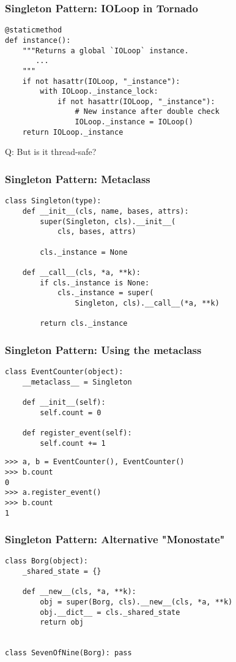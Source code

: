 \documentclass{beamer}
\begin{document}
\begin{frame}[fragile]
\frametitle{Singleton Pattern: IOLoop in Tornado}
\begin{footnotesize}
\begin{verbatim}
@staticmethod
def instance():
    """Returns a global `IOLoop` instance.
       ...
    """
    if not hasattr(IOLoop, "_instance"):
        with IOLoop._instance_lock:
            if not hasattr(IOLoop, "_instance"):
                # New instance after double check
                IOLoop._instance = IOLoop()
    return IOLoop._instance
\end{verbatim}
\end{footnotesize}
\linebreak
Q: But is it thread-safe?
\end{frame}

\begin{frame}[fragile]
\frametitle{Singleton Pattern: Metaclass}
\begin{verbatim}
class Singleton(type):
    def __init__(cls, name, bases, attrs):
        super(Singleton, cls).__init__(
            cls, bases, attrs)
        
        cls._instance = None

    def __call__(cls, *a, **k):
        if cls._instance is None:
            cls._instance = super(
                Singleton, cls).__call__(*a, **k)

        return cls._instance
\end{verbatim}
\end{frame}

\begin{frame}[fragile]
\frametitle{Singleton Pattern: Using the metaclass}
\begin{verbatim}
class EventCounter(object):
    __metaclass__ = Singleton

    def __init__(self):
        self.count = 0

    def register_event(self):
        self.count += 1
\end{verbatim}

\begin{verbatim}
>>> a, b = EventCounter(), EventCounter()
>>> b.count
0
>>> a.register_event()
>>> b.count
1
\end{verbatim}
\end{frame}

\begin{frame}[fragile]
\frametitle{Singleton Pattern: Alternative "Monostate"}
\begin{verbatim}
class Borg(object):
    _shared_state = {}

    def __new__(cls, *a, **k):
        obj = super(Borg, cls).__new__(cls, *a, **k)
        obj.__dict__ = cls._shared_state
        return obj


class SevenOfNine(Borg): pass
\end{verbatim}
\end{frame}
\end{document}
